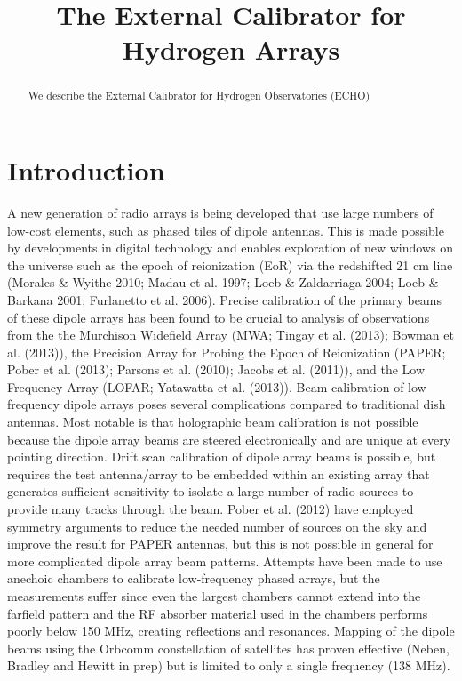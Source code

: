 \documentclass[preprint2,numberedappendix,tighten,twocolappendix]{aastex6}
\begin{document}
\title{The External Calibrator for Hydrogen Arrays}







\begin{abstract}
We describe the External Calibrator for Hydrogen Observatories (ECHO)
\end{abstract}




\section{Introduction}\label{sec:intro}

A new generation of radio arrays is being developed that use large numbers of low-cost elements, such as phased tiles of dipole antennas. This is made possible by developments in digital technology and enables exploration of new windows on the universe such as the epoch of reionization (EoR) via the redshifted 21 cm line (Morales \& Wyithe 2010; Madau et al. 1997; Loeb \& Zaldarriaga 2004; Loeb \& Barkana 2001; Furlanetto et al. 2006). Precise calibration of the primary beams of these dipole arrays has been found to be crucial to analysis of observations from the the Murchison Widefield Array (MWA; Tingay et al. (2013); Bowman et al. (2013)), the Precision Array for Probing the Epoch of Reionization (PAPER; Pober et al. (2013); Parsons et al. (2010); Jacobs et al. (2011)), and the Low Frequency Array (LOFAR; Yatawatta et al. (2013)). Beam calibration of low frequency dipole arrays poses several complications compared to traditional dish antennas. Most notable is that holographic beam calibration is not possible because the dipole array beams are steered electronically and are unique at every pointing direction. Drift scan calibration of dipole array beams is possible, but requires the test antenna/array to be embedded within an existing array that generates sufficient sensitivity to isolate a large number of radio sources to provide many tracks through the beam. Pober et al. (2012) have employed symmetry arguments to reduce the needed number of sources on the sky and improve the result for PAPER antennas, but this is not possible in general for more complicated dipole array beam patterns. Attempts have been made to use anechoic chambers to calibrate low-frequency phased arrays, but the measurements suffer since even the largest chambers cannot extend into the farfield pattern and the RF absorber material used in the chambers performs poorly below 150 MHz, creating reflections and resonances. Mapping of the dipole beams using the Orbcomm constellation of satellites has proven effective (Neben, Bradley and Hewitt in prep) but is limited to only a single frequency (138 MHz).
\end{document}

